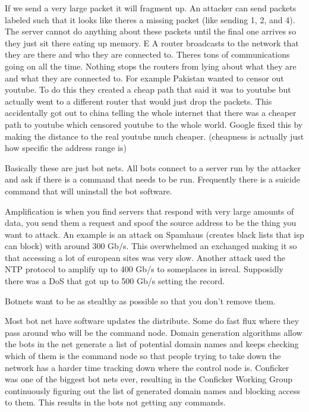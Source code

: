 \documentclass{article}
\begin{document}
If we send a very large packet it will fragment up. An attacker can send packets labeled such that it looks like theres a missing packet (like sending 1, 2, and 4). The server cannot do anything about these packets until the final one arrives so they just sit there eating up memory.
E
A router broadcasts to the network that they are there and who they are connected to. Theres tons of communications going on all the time. Nothing stops the routers from lying about what they are and what they are connected to. For example Pakistan wanted to censor out youtube. To do this they created a cheap path that said it was to youtube but actually went to a different router that would just drop the packets. This accidentally got out to china telling the whole internet that there was a cheaper path to youtube which censored youtube to the whole world. Google fixed this by making the distance to the real youtube much cheaper. (cheapness is actually just how specific the address range is) 






Basically these are just bot nets. All bots connect to a server run by the attacker and ask if there is a command that needs to be run. Frequently there is a suicide command that will uninstall the bot software. 


Amplification is when you find servers that respond with very large amounts of data, you send them a request and spoof the source address to be the thing you want to attack. An example is an attack on Spamhaus (creates black lists that isp can block) with around 300 Gb/s. This overwhelmed an exchanged making it so that accessing a lot of european sites was very slow. Another attack used the NTP protocol to amplify up to 400 Gb/s to someplaces in isreal. Supposidly there was a DoS that got up to 500 Gb/s setting the record.




Botnets want to be as stealthy as possible so that you don't remove them.


Most bot net have software updates the distribute. Some do fast flux where they pass around who will be the command node. Domain generation algorithms allow the bots in the net generate a list of potential domain names and keeps checking which of them is the command node so that people trying to take down the network has a harder time tracking down where the control node is. Conficker was one of the biggest bot nets ever, resulting in the Conficker Working Group continuously figuring out the list of generated domain names and blocking access to them. This results in the bots not getting any commands. 
\end{document}

